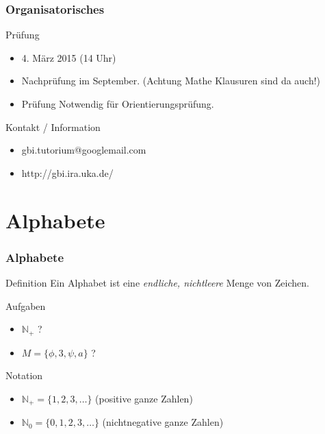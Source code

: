 \documentclass{beamer}
\begin{document}
\begin{frame}
	\frametitle {Organisatorisches}
	\begin{block}{Prüfung}
        		\begin{itemize}
			\item 4. März 2015 (14 Uhr)
			\item Nachprüfung im September. (Achtung Mathe Klausuren sind da 					auch!)
			\item Prüfung Notwendig für Orientierungsprüfung.
		\end{itemize}
	\end{block}
	
	\begin{block}{Kontakt / Information}
		\begin{itemize}
			\item gbi.tutorium@googlemail.com
			\item http://gbi.ira.uka.de/
		\end{itemize}
	\end{block}
\end{frame}

\section{Alphabete}
\begin{frame}
	\frametitle{Alphabete}
	\begin{block}{Definition}
		Ein Alphabet ist eine \emph{endliche, nichtleere} Menge von Zeichen.
	\end{block}
	\begin{exampleblock}{Aufgaben}
		\begin{itemize}
			\item $\mathbb N$\(_{+}\) ?
			\item \(M=\{\phi,3,\psi,a\}\) ?
		\end{itemize}
	\end{exampleblock}
	\pause
	\begin{alertblock}{Notation}
		\begin{itemize}
			\item $\mathbb N$\(_{+}=\{1,2,3,\dots\}\) (positive ganze Zahlen)
			\item $\mathbb N$\(_{0}=\{0,1,2,3,\dots\}\) (nichtnegative ganze 					Zahlen)
		\end{itemize}
	\end{alertblock}
\end{frame}
\end{document}
